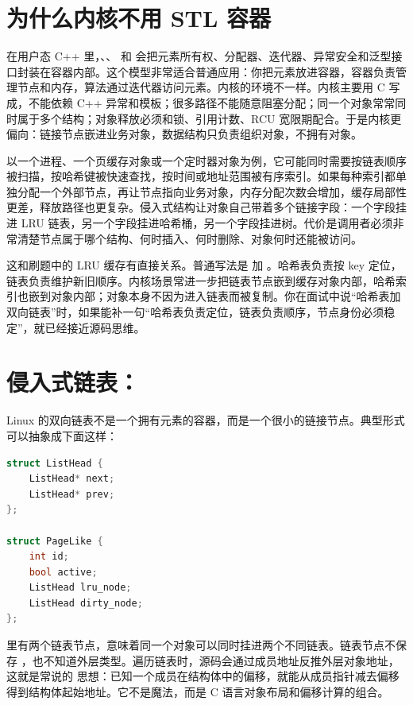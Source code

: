 \section{为什么内核不用 STL 容器}

在用户态 C++ 里，、、 和  会把元素所有权、分配器、迭代器、异常安全和泛型接口封装在容器内部。这个模型非常适合普通应用：你把元素放进容器，容器负责管理节点和内存，算法通过迭代器访问元素。内核的环境不一样。内核主要用 C 写成，不能依赖 C++ 异常和模板；很多路径不能随意阻塞分配；同一个对象常常同时属于多个结构；对象释放必须和锁、引用计数、RCU 宽限期配合。于是内核更偏向：链接节点嵌进业务对象，数据结构只负责组织对象，不拥有对象。

以一个进程、一个页缓存对象或一个定时器对象为例，它可能同时需要按链表顺序被扫描，按哈希键被快速查找，按时间或地址范围被有序索引。如果每种索引都单独分配一个外部节点，再让节点指向业务对象，内存分配次数会增加，缓存局部性更差，释放路径也更复杂。侵入式结构让对象自己带着多个链接字段：一个字段挂进 LRU 链表，另一个字段挂进哈希桶，另一个字段挂进树。代价是调用者必须非常清楚节点属于哪个结构、何时插入、何时删除、对象何时还能被访问。

这和刷题中的 LRU 缓存有直接关系。普通写法是  加 。哈希表负责按 key 定位，链表负责维护新旧顺序。内核场景常进一步把链表节点嵌到缓存对象内部，哈希索引也嵌到对象内部；对象本身不因为进入链表而被复制。你在面试中说“哈希表加双向链表”时，如果能补一句“哈希表负责定位，链表负责顺序，节点身份必须稳定”，就已经接近源码思维。

\section{侵入式链表：}

Linux 的双向链表不是一个拥有元素的容器，而是一个很小的链接节点。典型形式可以抽象成下面这样：

\begin{lstlisting}[language=C++,caption={教学化简版：侵入式双向链表节点}]
struct ListHead {
    ListHead* next;
    ListHead* prev;
};

struct PageLike {
    int id;
    bool active;
    ListHead lru_node;
    ListHead dirty_node;
};
\end{lstlisting}

 里有两个链表节点，意味着同一个对象可以同时挂进两个不同链表。链表节点不保存 ，也不知道外层类型。遍历链表时，源码会通过成员地址反推外层对象地址，这就是常说的  思想：已知一个成员在结构体中的偏移，就能从成员指针减去偏移得到结构体起始地址。它不是魔法，而是 C 语言对象布局和偏移计算的组合。


